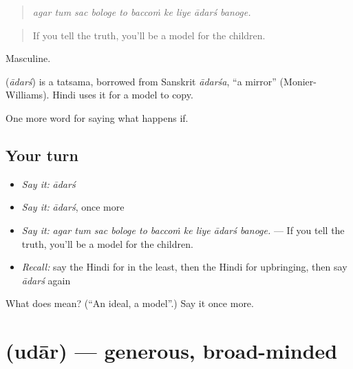\begin{quote}
         
\end{quote}

\begin{quote}
\emph{agar tum sac bologe to baccoṁ ke liye ādarś banoge.}
\end{quote}

\begin{quote}
If you tell the truth, you'll be a model for the children.
\end{quote}

Masculine.

\begin{cousinweb}
\textbf{} (\emph{ādarś}) is a tatsama, borrowed from Sanskrit \emph{ādarśa}, \textquotedblleft{}a mirror\textquotedblright{} (Monier-Williams). Hindi uses it for a model to copy.
\end{cousinweb}

\begin{grammarlens}[title={What you've built}]
One more word for saying what happens if.
\end{grammarlens}

\subsection*{Your turn}
\begin{itemize}
\raggedright
  \item \emph{Say it:} \emph{ādarś}
  \item \emph{Say it:} \emph{ādarś}, once more
  \item \emph{Say it:} \emph{agar tum sac bologe to baccoṁ ke liye ādarś banoge.} — If you tell the truth, you'll be a model for the children.
  \item \emph{Recall:} say the Hindi for in the least, then the Hindi for upbringing, then say \emph{ādarś} again
\end{itemize}

\begin{tcolorbox}[breakable,colback=teal!4,colframe=teal!35!black,title={Before you move on}]
What does  mean? (\textquotedblleft{}An ideal, a model\textquotedblright{}.) Say it once more.
\end{tcolorbox}
\section[\texorpdfstring{\hi{उदार} (udār)}{उदार (udār)}]{ (udār) — generous, broad-minded}


